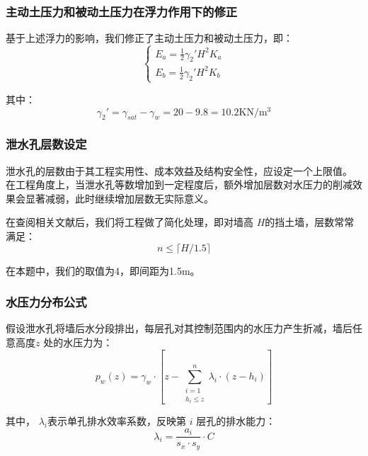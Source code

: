 \documentclass[withoutpreface,bwprint]{cumcmthesis}
\begin{document}
\subsubsection{主动土压力和被动土压力在浮力作用下的修正}
基于上述浮力的影响，我们修正了主动土压力和被动土压力，即：
    \begin{equation}
            \left\{
                \begin{aligned}
                    E_a=\frac{1}{2} \gamma_2'H^2K_a\\
                    E_b=\frac{1}{2} \gamma_2'H^2K_b
                \end{aligned}
            \right.
    \end{equation}

其中：$$\gamma_2'=\gamma_{sat}-\gamma_{w}=20-9.8=10.2\mathrm{KN/m^3}$$

\subsubsection{泄水孔层数设定}
泄水孔的层数由于其工程实用性、成本效益及结构安全性，应设定一个上限值。
在工程角度上，当泄水孔等数增加到一定程度后，额外增加层数对水压力的削减效果会显著减弱，此时继续增加层数无实际意义。
\par
在查阅相关文献后，我们将工程做了简化处理，即对墙高
$H$的挡土墙，层数常常满足：
    \begin{equation}
        n \leq \lceil H / 1.5 \rceil 
    \end{equation}
\par
在本题中，我们的取值为4，即间距为1.5m。


\subsubsection{水压力分布公式}
假设泄水孔将墙后水分段排出，每层孔对其控制范围内的水压力产生折减，墙后任意高度$z$
处的水压力为：
    \begin{equation}
        p_w(z) = \gamma_w \cdot \left[ z - \sum_{\substack{i=1 \\ h_i \leq z}}^{n} \lambda_i \cdot (z - h_i) \right]
    \end{equation}
    \par
其中，
$\lambda_i$表示单孔排水效率系数，反映第 $i$ 层孔的排水能力：
$$\lambda_i = \frac{a_i}{s_x \cdot s_y} \cdot C$$
\end{document}

